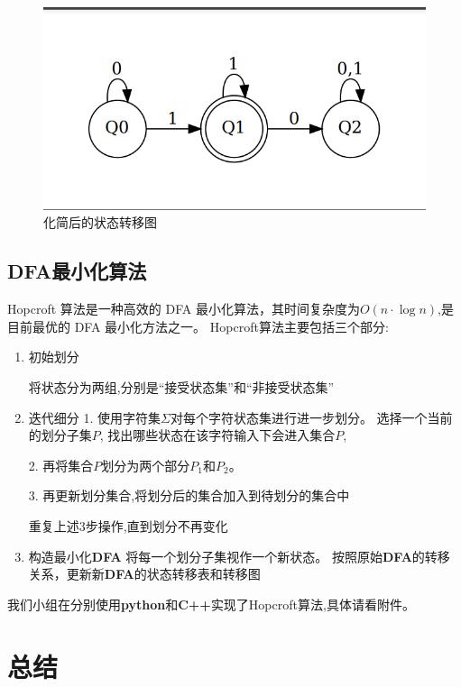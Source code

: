 \documentclass{article}
\begin{document}
\begin{figure}[h]
    \centering
    \includegraphics[scale=0.2]{../Img/minimized_dfa_example.png}
    \caption{化简后的状态转移图}
\end{figure}




\subsection{DFA最小化算法}
Hopcroft 算法是一种高效的 DFA 最小化算法，其时间复杂度为$O(n\cdot \log n)$,是目前最优的 DFA 最小化方法之一。
Hopcroft算法主要包括三个部分:
\begin{enumerate}
    \item 初始划分
        
    
    将状态分为两组,分别是“接受状态集”和“非接受状态集”

    \item 迭代细分 
        1. 使用字符集$\Sigma$对每个字符状态集进行进一步划分。
        选择一个当前的划分子集$P$, 找出哪些状态在该字符输入下会进入集合$P$,
    
        2. 再将集合$P$划分为两个部分$P_1$和$P_2$。
        
        3. 再更新划分集合,将划分后的集合加入到待划分的集合中

        重复上述3步操作,直到划分不再变化        

    \item 构造最小化\textbf{DFA}
        将每一个划分子集视作一个新状态。
        按照原始\textbf{DFA}的转移关系，更新新\textbf{DFA}的状态转移表和转移图
\end{enumerate}

    我们小组在分别使用\textbf{python}和\textbf{C++}实现了Hopcroft算法,具体请看附件。

\newpage
\section{总结}
\end{document}
